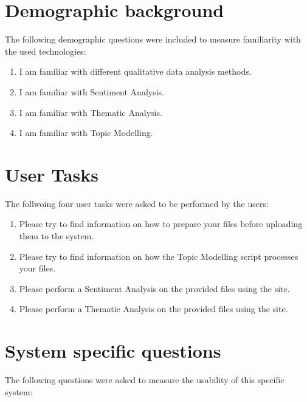 \documentclass{l4proj}
\begin{document}
\begin{appendices}
 \section{Demographic background}
 The following demographic questions were included to measure familiarity with the used technologies:
 \begin{enumerate}
     \item I am familiar with different qualitative data analysis methods.
     \item I am familiar with Sentiment Analysis.
     \item I am familiar with Thematic Analysis.
     \item I am familiar with Topic Modelling.
 \end{enumerate}

 \section{User Tasks}
 The follwoing four user tasks were asked to be performed by the users:
 \begin{enumerate}
     \item Please try to find information on how to prepare your files before uploading them to the system.
     \item Please try to find information on how the Topic Modelling script processes your files.
     \item Please perform a Sentiment Analysis on the provided files using the site.
     \item Please perform a Thematic Analysis on the provided files using the site.
 \end{enumerate}

 \section{System specific questions}
 The following questions were asked to measure the usability of this specific system:


\end{appendices}
\end{document}
